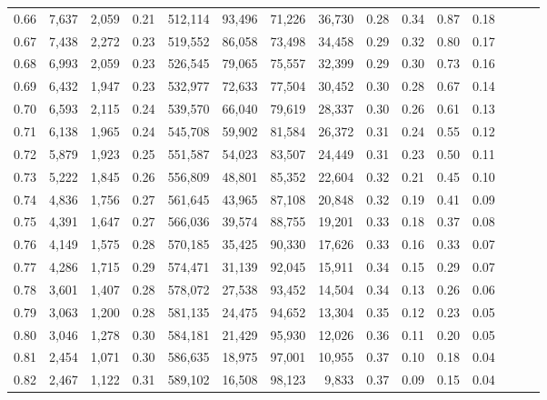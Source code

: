\begin{tabular}{rrrrrrrrrrrrrrr}
0.66 &   7,637 &  2,059 &  0.21 &  512,114 &   93,496 &   71,226 &   36,730 &  0.28 &  0.34 &  0.87 &      0.18 \\
0.67 &   7,438 &  2,272 &  0.23 &  519,552 &   86,058 &   73,498 &   34,458 &  0.29 &  0.32 &  0.80 &      0.17 \\
0.68 &   6,993 &  2,059 &  0.23 &  526,545 &   79,065 &   75,557 &   32,399 &  0.29 &  0.30 &  0.73 &      0.16 \\
0.69 &   6,432 &  1,947 &  0.23 &  532,977 &   72,633 &   77,504 &   30,452 &  0.30 &  0.28 &  0.67 &      0.14 \\
0.70 &   6,593 &  2,115 &  0.24 &  539,570 &   66,040 &   79,619 &   28,337 &  0.30 &  0.26 &  0.61 &      0.13 \\
0.71 &   6,138 &  1,965 &  0.24 &  545,708 &   59,902 &   81,584 &   26,372 &  0.31 &  0.24 &  0.55 &      0.12 \\
0.72 &   5,879 &  1,923 &  0.25 &  551,587 &   54,023 &   83,507 &   24,449 &  0.31 &  0.23 &  0.50 &      0.11 \\
0.73 &   5,222 &  1,845 &  0.26 &  556,809 &   48,801 &   85,352 &   22,604 &  0.32 &  0.21 &  0.45 &      0.10 \\
0.74 &   4,836 &  1,756 &  0.27 &  561,645 &   43,965 &   87,108 &   20,848 &  0.32 &  0.19 &  0.41 &      0.09 \\
0.75 &   4,391 &  1,647 &  0.27 &  566,036 &   39,574 &   88,755 &   19,201 &  0.33 &  0.18 &  0.37 &      0.08 \\
0.76 &   4,149 &  1,575 &  0.28 &  570,185 &   35,425 &   90,330 &   17,626 &  0.33 &  0.16 &  0.33 &      0.07 \\
0.77 &   4,286 &  1,715 &  0.29 &  574,471 &   31,139 &   92,045 &   15,911 &  0.34 &  0.15 &  0.29 &      0.07 \\
0.78 &   3,601 &  1,407 &  0.28 &  578,072 &   27,538 &   93,452 &   14,504 &  0.34 &  0.13 &  0.26 &      0.06 \\
0.79 &   3,063 &  1,200 &  0.28 &  581,135 &   24,475 &   94,652 &   13,304 &  0.35 &  0.12 &  0.23 &      0.05 \\
0.80 &   3,046 &  1,278 &  0.30 &  584,181 &   21,429 &   95,930 &   12,026 &  0.36 &  0.11 &  0.20 &      0.05 \\
0.81 &   2,454 &  1,071 &  0.30 &  586,635 &   18,975 &   97,001 &   10,955 &  0.37 &  0.10 &  0.18 &      0.04 \\
0.82 &   2,467 &  1,122 &  0.31 &  589,102 &   16,508 &   98,123 &    9,833 &  0.37 &  0.09 &  0.15 &      0.04 \\

\end{tabular}
